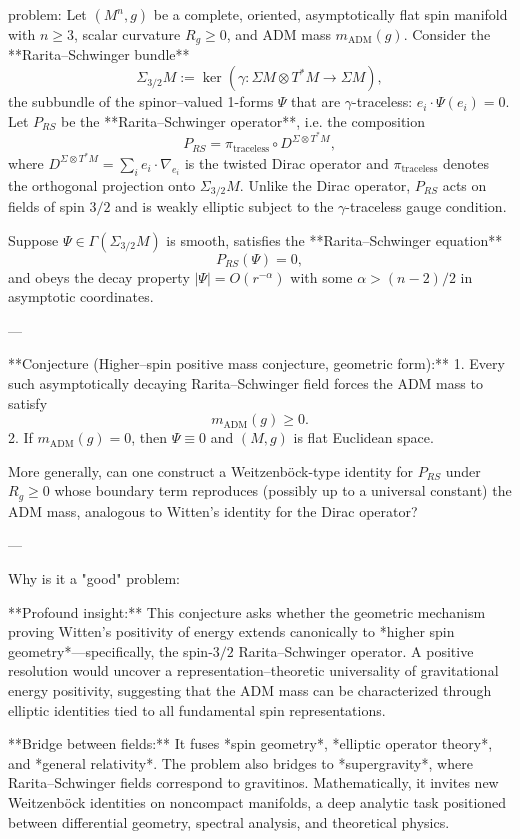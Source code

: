 problem:  
Let \((M^n,g)\) be a complete, oriented, asymptotically flat spin manifold with \(n\ge 3\), scalar curvature \(R_g\ge 0\), and ADM mass \(m_{\mathrm{ADM}}(g)\).  
Consider the **Rarita–Schwinger bundle**
\[
\Sigma_{3/2}M := \ker(\gamma:\Sigma M\otimes T^*M \to \Sigma M),
\]
the subbundle of the spinor–valued 1-forms \(\Psi\) that are \(\gamma\)-traceless: \(e_i\cdot \Psi(e_i)=0\).  
Let \(P_{RS}\) be the **Rarita–Schwinger operator**, i.e. the composition
\[
P_{RS} = \pi_{\mathrm{traceless}}\circ D^{\Sigma\otimes T^*M},
\]
where \(D^{\Sigma\otimes T^*M}=\sum_i e_i\cdot \nabla_{e_i}\) is the twisted Dirac operator and \(\pi_{\mathrm{traceless}}\) denotes the orthogonal projection onto \(\Sigma_{3/2}M\).  
Unlike the Dirac operator, \(P_{RS}\) acts on fields of spin \(3/2\) and is weakly elliptic subject to the \(\gamma\)-traceless gauge condition.

Suppose \(\Psi\in \Gamma(\Sigma_{3/2}M)\) is smooth, satisfies the **Rarita–Schwinger equation**
\[
P_{RS}(\Psi)=0,
\]
and obeys the decay property \(|\Psi|=O(r^{-\alpha})\) with some \(\alpha>(n-2)/2\) in asymptotic coordinates.  

---

**Conjecture (Higher–spin positive mass conjecture, geometric form):**  
1. Every such asymptotically decaying Rarita–Schwinger field forces the ADM mass to satisfy
\[
m_{\mathrm{ADM}}(g)\ge 0.
\]
2. If \(m_{\mathrm{ADM}}(g)=0\), then \(\Psi\equiv 0\) and \((M,g)\) is flat Euclidean space.  

More generally, can one construct a Weitzenböck-type identity for \(P_{RS}\) under \(R_g\ge 0\) whose boundary term reproduces (possibly up to a universal constant) the ADM mass, analogous to Witten’s identity for the Dirac operator?

---

Why is it a "good" problem:  

**Profound insight:**  
This conjecture asks whether the geometric mechanism proving Witten’s positivity of energy extends canonically to *higher spin geometry*—specifically, the spin‑\(3/2\) Rarita–Schwinger operator.  A positive resolution would uncover a representation–theoretic universality of gravitational energy positivity, suggesting that the ADM mass can be characterized through elliptic identities tied to all fundamental spin representations.

**Bridge between fields:**  
It fuses *spin geometry*, *elliptic operator theory*, and *general relativity*.  The problem also bridges to *supergravity*, where Rarita–Schwinger fields correspond to gravitinos.  Mathematically, it invites new Weitzenböck identities on noncompact manifolds, a deep analytic task positioned between differential geometry, spectral analysis, and theoretical physics.

